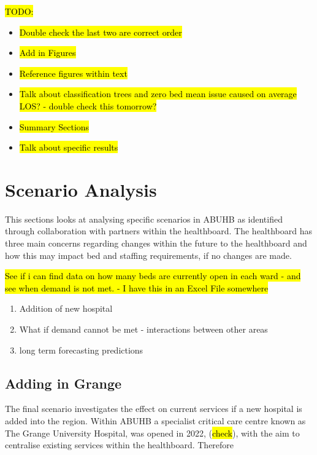 \documentclass[../thesis.tex]{subfiles}
\begin{document}
\hl{TODO:}
\begin{itemize}
    \item \hl{Double check the last two are correct order}
    \item \hl{Add in Figures}
    \item \hl{Reference figures within text}
    \item \hl{Talk about classification trees and zero bed mean issue caused on average LOS? - double check this tomorrow?}
    \item \hl{Summary Sections}
    \item \hl{Talk about specific results}
\end{itemize}


\newpage

















\section{Scenario Analysis}
This sections looks at analysing specific scenarios in ABUHB as identified through collaboration with partners within the healthboard. The healthboard has three main concerns regarding changes within the future to the healthboard and how this may impact bed and staffing requirements, if no changes are made.

\hl{See if i can find data on how many beds are currently open in each ward - and see when demand is not met. - I have this in an Excel File somewhere}

\begin{enumerate}
    \item Addition of new hospital
    \item What if demand cannot be met - interactions between other areas 
    \item long term forecasting predictions
\end{enumerate}
\subsection{Adding in Grange}
The final scenario investigates the effect on current services if a new hospital is added into the region. Within ABUHB a specialist critical care centre known as The Grange University Hospital, was opened in 2022, (\hl{check}), with the aim to centralise existing services within the healthboard. Therefore
\end{document}
